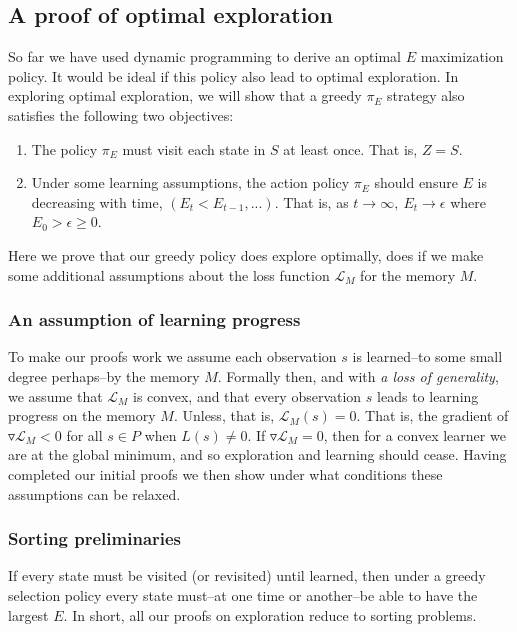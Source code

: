\documentclass[9pt,twocolumn,twoside]{pnas-new}
\begin{document}
\subsection*{A proof of optimal exploration}
So far we have used dynamic programming to derive an optimal $E$ maximization policy. It would be ideal if this policy also lead to optimal exploration. In exploring optimal exploration, we will show that a greedy $\pi_E$ strategy also satisfies the following two objectives:

\begin{enumerate}[noitemsep,wide=0pt,leftmargin=\dimexpr\labelwidth+2\labelsep\relax]
    \item The policy $\pi_E$ must visit each state in $S$ at least once. That is, $Z = S$.
    \item Under some learning assumptions, the action policy $\pi_E$ should ensure $E$ is decreasing with time, $(E_t < E_{t-1}, ...)$. That is, as $t \rightarrow \infty,\ E_t \rightarrow \epsilon$ where $E_0 > \epsilon \geq 0$.
\end{enumerate}

Here we prove that our greedy policy does explore optimally, does if we make some additional assumptions about the loss function $\mathcal{L}_M$ for the memory $M$. 

\subsubsection*{An assumption of learning progress}
To make our proofs work we assume each observation $s$ is learned--to some small degree perhaps--by the memory $M$. Formally then, and with \textit{a loss of generality}, we assume that $\mathcal{L}_M$ is convex, and that every observation $s$ leads to learning progress on the memory $M$. Unless, that is, $\mathcal{L}_M(s) = 0$. That is, the gradient of $\triangledown \mathcal{L}_M < 0$ for all $s \in P$ when $L(s) \neq 0$. If $\triangledown \mathcal{L}_M = 0$, then for a convex learner we are at the global minimum, and so exploration and learning should cease. Having completed our initial proofs we then show under what conditions these assumptions can be relaxed.

\subsubsection*{Sorting preliminaries}
If every state must be visited (or revisited) until learned, then under a greedy selection policy every state must--at one time or another--be able to have the largest $E$. In short, all our proofs on exploration reduce to sorting problems.
\end{document}
